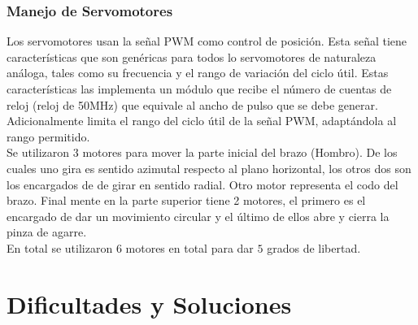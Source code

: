 \documentclass[twocolumn]{IEEEtran}
\begin{document}
\subsubsection{Manejo de Servomotores}
\noindent
Los servomotores usan la señal PWM como control de posición. Esta señal tiene características que son genéricas para todos lo servomotores de naturaleza análoga, tales como su frecuencia y el rango de variación del ciclo útil. Estas características las implementa un módulo que recibe el número de cuentas de reloj (reloj de 50MHz) que equivale al ancho de pulso que se debe generar. Adicionalmente limita el rango del ciclo útil de la señal PWM, adaptándola al rango permitido.\\
Se utilizaron $3$ motores para mover la parte inicial del brazo (Hombro). De los cuales uno gira es sentido azimutal respecto al plano horizontal, los otros dos son los encargados de de girar en sentido radial. Otro motor representa el codo del brazo. Final mente en la parte superior tiene 2 motores, el primero es el encargado de dar un movimiento circular y el último de ellos abre y cierra la pinza de agarre.\\
En total se utilizaron $6$ motores en total para dar $5$ grados de libertad.

\section{Dificultades y Soluciones}
\end{document}
